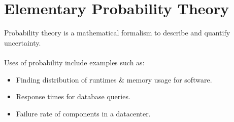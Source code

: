 \chapter{Elementary Probability Theory}

Probability theory is a mathematical formalism to describe and quantify uncertainty.
\\
\\ Uses of probability include examples such as:
\begin{itemize}
	\item Finding distribution of runtimes \& memory usage for software.
	\item Response times for database queries.
	\item Failure rate of components in a datacenter.
\end{itemize}

